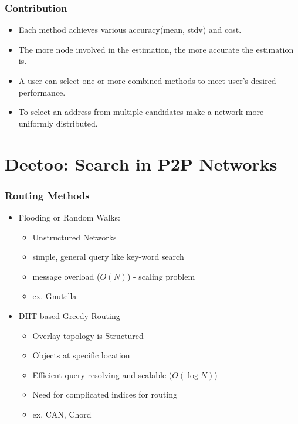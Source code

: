 \documentclass[red]{beamer}
\begin{document}
\begin{frame}
\frametitle{Contribution}
\begin{itemize}
\item Each method achieves various accuracy(mean, stdv) and cost.
\item The more node involved in the estimation, the more accurate the estimation is.
\item A user can select one or more combined methods to meet user's desired performance.
\item To select an address from multiple candidates make a network more uniformly distributed.
\end{itemize}
\end{frame}


\section{Deetoo: Search in P2P Networks}



\begin{frame}
\frametitle{Routing Methods}
\begin{itemize}
\item
Flooding or Random Walks:
\begin{itemize}
\item Unstructured Networks
\item simple, general query like key-word search
\item message overload ($O(N)$) - scaling problem
\item ex. Gnutella
\end{itemize}
\item
DHT-based Greedy Routing
\begin{itemize}
\item Overlay topology is Structured
\item Objects at specific location
\item Efficient query resolving and scalable ($O(\log{N})$)
\item Need for complicated indices for routing
\item ex. CAN, Chord
\end{itemize}
\end{itemize}

\end{frame}
\end{document}
